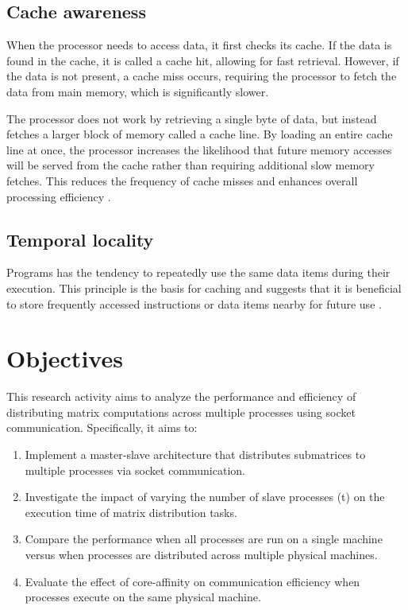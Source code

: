 \documentclass[journal]{./IEEE/IEEEtran}
\begin{document}
\subsection{Cache awareness}
When the processor needs to access data, it first checks its cache.
If the data is found in the cache, it is called a cache hit, allowing for fast retrieval.
However, if the data is not present, a cache miss occurs, requiring the processor to fetch the data from main memory, which is significantly slower.

The processor does not work by retrieving a single byte of data, but instead fetches a larger block of memory called a cache line.
By loading an entire cache line at once, the processor increases the likelihood that future memory accesses will be served from the cache rather than requiring additional slow memory fetches.
This reduces the frequency of cache misses and enhances overall processing efficiency \cite{newhehe}.

\subsection{Temporal locality}
Programs has the tendency to repeatedly use the same data items during their execution. This principle is the basis for caching and suggests that it is beneficial to store frequently accessed instructions or data items nearby for future use \cite{jacob2010memory}.




\section{Objectives}
    This research activity aims to analyze the performance and efficiency of distributing matrix computations across multiple processes using socket communication.
    Specifically, it aims to:
\begin{enumerate}
    \item Implement a master-slave architecture that distributes submatrices to multiple processes via socket communication.
    \item Investigate the impact of varying the number of slave processes (t) on the execution time of matrix distribution tasks.
    \item Compare the performance when all processes are run on a single machine versus when processes are distributed across multiple physical machines.
    \item Evaluate the effect of core-affinity on communication efficiency when processes execute on the same physical machine.
\end{enumerate}
\end{document}
